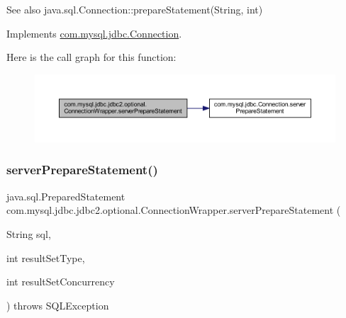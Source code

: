 \begin{DoxySeeAlso}{See also}
java.\+sql.\+Connection\+::prepare\+Statement(\+String, int) 
\end{DoxySeeAlso}


Implements \mbox{\hyperlink{interfacecom_1_1mysql_1_1jdbc_1_1_connection_ab063bf6d934fba06ba65eaa68aa06ef6}{com.\+mysql.\+jdbc.\+Connection}}.

Here is the call graph for this function\+:
\nopagebreak
\begin{figure}[H]
\begin{center}
\leavevmode
\includegraphics[width=350pt]{classcom_1_1mysql_1_1jdbc_1_1jdbc2_1_1optional_1_1_connection_wrapper_a83b5601387fe6a749d66a4c7a18315a4_cgraph}
\end{center}
\end{figure}
\mbox{\label{classcom_1_1mysql_1_1jdbc_1_1jdbc2_1_1optional_1_1_connection_wrapper_a46f978f9cb59c27e48921735fd605245}} 
\subsubsection{\texorpdfstring{server\+Prepare\+Statement()}{serverPrepareStatement()}\hspace{0.1cm}{\footnotesize\ttfamily [3/6]}}
{\footnotesize\ttfamily java.\+sql.\+Prepared\+Statement com.\+mysql.\+jdbc.\+jdbc2.\+optional.\+Connection\+Wrapper.\+server\+Prepare\+Statement (\begin{DoxyParamCaption}\item[{String}]{sql,  }\item[{int}]{result\+Set\+Type,  }\item[{int}]{result\+Set\+Concurrency }\end{DoxyParamCaption}) throws S\+Q\+L\+Exception}

